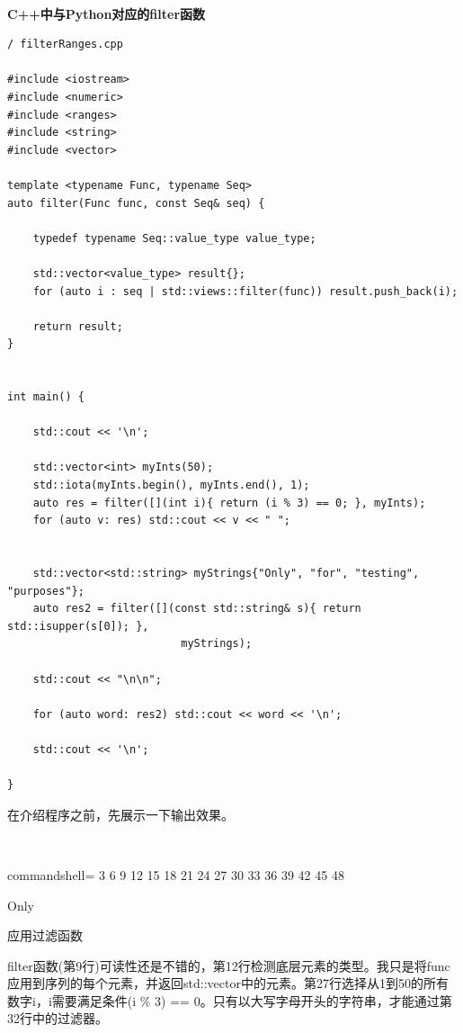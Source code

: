 \hspace*{\fill} \\ %
\noindent
\textbf{C++中与Python对应的filter函数}
\begin{lstlisting}[style=styleCXX]
/ filterRanges.cpp

#include <iostream>
#include <numeric>
#include <ranges>
#include <string>
#include <vector>

template <typename Func, typename Seq>
auto filter(Func func, const Seq& seq) {

	typedef typename Seq::value_type value_type;
	
	std::vector<value_type> result{};
	for (auto i : seq | std::views::filter(func)) result.push_back(i);
	
	return result;
}


int main() {
	
	std::cout << '\n';
	
	std::vector<int> myInts(50);
	std::iota(myInts.begin(), myInts.end(), 1);
	auto res = filter([](int i){ return (i % 3) == 0; }, myInts);
	for (auto v: res) std::cout << v << " ";
	
	
	std::vector<std::string> myStrings{"Only", "for", "testing", "purposes"};
	auto res2 = filter([](const std::string& s){ return std::isupper(s[0]); },
	                       myStrings);
	
	std::cout << "\n\n";
	
	for (auto word: res2) std::cout << word << '\n';
	
	std::cout << '\n';

}
\end{lstlisting}

在介绍程序之前，先展示一下输出效果。

\hspace*{\fill} \\ %
\begin{tcblisting}{commandshell={}}
3 6 9 12 15 18 21 24 27 30 33 36 39 42 45 48

Only
\end{tcblisting}

\begin{center}
应用过滤函数
\end{center}

filter函数(第9行)可读性还是不错的，第12行检测底层元素的类型。我只是将func应用到序列的每个元素，并返回std::vector中的元素。第27行选择从1到50的所有数字i，i需要满足条件(i \% 3) == 0。只有以大写字母开头的字符串，才能通过第32行中的过滤器。

